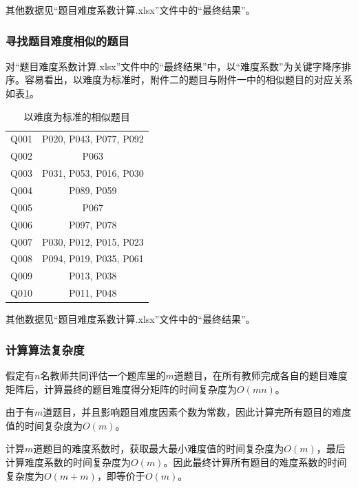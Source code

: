 其他数据见“题目难度系数计算.xlsx”文件中的“最终结果”。

\subsubsection{寻找题目难度相似的题目}

对“题目难度系数计算.xlsx”文件中的“最终结果”中，以“难度系数”为关键字降序排序。容易看出，以难度为标准时，附件二的题目与附件一中的相似题目的对应关系如表\ref{tablesmr}。

\begin{table}[htbp]
    \centering
    \label{tablesmr}
    \caption{以难度为标准的相似题目}
    \begin{tabular}{@{}cc@{}}
    \toprule
    \quad\quad\quad\quad{}\quad\quad\quad\quad\quad & \quad\quad\quad\quad{}\quad\quad\quad\quad\quad\\ \midrule
    Q001 & P020, P043, P077, P092 \\
    Q002 & P063 \\
    Q003 & P031, P053, P016, P030 \\
    Q004 & P089, P059 \\
    Q005 & P067 \\
    Q006 & P097, P078 \\
    Q007 & P030, P012, P015, P023 \\
    Q008 & P094, P019, P035, P061 \\
    Q009 & P013, P038 \\
    Q010 & P011, P048 \\ \bottomrule
    \end{tabular}
\end{table}

其他数据见“题目难度系数计算.xlsx”文件中的“最终结果”。

\subsubsection{计算算法复杂度}

假定有$n$名教师共同评估一个题库里的$m$道题目，在所有教师完成各自的题目难度矩阵后，计算最终的题目难度得分矩阵的时间复杂度为$O(mn)$。

由于有$m$道题目，并且影响题目难度因素个数为常数，因此计算完所有题目的难度值的时间复杂度为$O(m)$。

计算$m$道题目的难度系数时，获取最大最小难度值的时间复杂度为$O(m)$，最后计算难度系数的时间复杂度为$O(m)$。因此最终计算所有题目的难度系数的时间复杂度为$O(m + m)$，即等价于$O(m)$。

